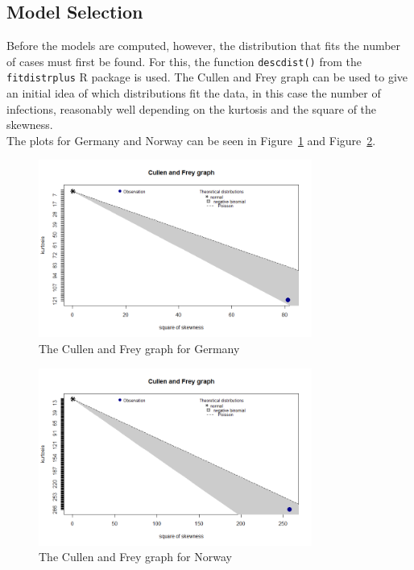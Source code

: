 \subsection{Model Selection}
Before the models are computed, however, the distribution that fits the number of cases must first be found. For this, the function \texttt{descdist()} from the \texttt{fitdistrplus} R package is used. The Cullen and Frey graph can be used to give an initial idea of which distributions fit the data, in this case the number of infections, reasonably well depending on the kurtosis and the square of the skewness. \\
The plots for Germany and Norway can be seen in Figure~\ref{cf_germany} and Figure~\ref{cf_norge}.
%     
\begin{figure}[H]
    \centering
    \includegraphics[width = 0.8\textwidth]{cf_germany.png}
    \caption{The Cullen and Frey graph for Germany}
    \label{cf_germany}
\end{figure}
%     
\begin{figure}[H]
    \centering
    \includegraphics[width = 0.8\textwidth]{cf_norge.png}
    \caption{The Cullen and Frey graph for Norway}
    \label{cf_norge}
\end{figure}
